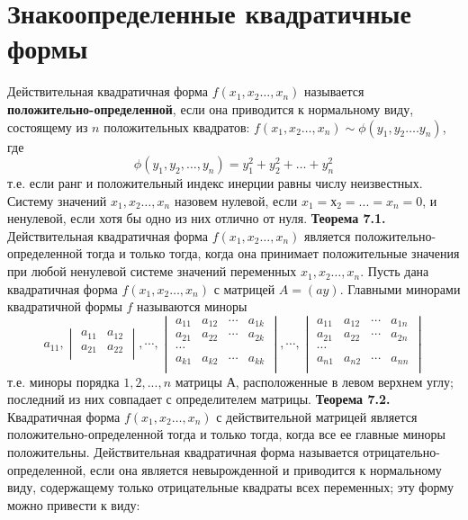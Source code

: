 \documentclass[bachelor, och, coursework, times]{SCWorks}
\newcommand\tab[1][1cm]{\hspace*{#1}}
\newcommand{\tl}{\newline\tab}
\begin{document}
\section{Знакоопределенные квадратичные формы}
\tab Действительная квадратичная форма $f(x_1,x_2…,x_n)$ называется\\ \textbf{положительно-определенной}, если она приводится к нормальному виду, состоящему из $n$ положительных квадратов: $f(x_1,x_2…,x_n) \sim \phi(y_1,y_2….y_n)$, где \newline
$$\phi(y_1,y_2, … ,y_n)=y_1^2+y_2^2+…+y_n^2$$ т.е. если ранг и положительный индекс инерции равны числу неизвестных.
\tl
Систему значений $x_1,x_2…,x_n$ назовем нулевой, если $x_1 = х_2 = ... = x_n = 0$, и ненулевой, если хотя бы одно из них отлично от нуля.
\tl
\textbf{Теорема 7.1.} Действительная квадратичная форма $f(x_1,x_2…,x_n)$ является положительно-определенной тогда и только тогда, когда она принимает положительные значения при любой ненулевой системе значений переменных $x_1,x_2…,x_n$.
\tl Пусть дана квадратичная форма $f(x_1,x_2…,x_n)$ с матрицей $A = (ay)$. Главными минорами квадратичной формы $f$ называются миноры  
$$a_{11}, 
\begin{vmatrix}
a_{11} & a_{12} \\ 
a_{21} & a_{22} \\ 
\end{vmatrix},
\cdots
,
\begin{vmatrix}
a_{11} & a_{12} & \cdots & a_{1k} \\ 
a_{21} & a_{22} & \cdots & a_{2k} \\ 
\cdots \\
a_{k1} & a_{k2} & \cdots & a_{kk} \\ 
\end{vmatrix}
,
\cdots
,
\begin{vmatrix}
a_{11} & a_{12} & \cdots & a_{1n} \\ 
a_{21} & a_{22} & \cdots & a_{2n} \\ 
\cdots \\
a_{n1} & a_{n2} & \cdots & a_{nn} \\ 
\end{vmatrix}
$$
\tab т.е. миноры порядка $1, 2, ... , n$ матрицы $А$, расположенные в левом верхнем углу; последний из них совпадает с определителем матрицы.
\tl
\textbf{Теорема 7.2.} Квадратичная форма $f(x_1,x_2…,x_n)$ с действительной матрицей является положительно-определенной тогда и только тогда, когда все ее главные миноры положительны.
\tl
Действительная квадратичная форма называется отрицательно-определенной, если она является невырожденной и приводится к нормальному виду, содержащему только отрицательные квадраты всех переменных; эту форму можно привести к виду:
\end{document}
